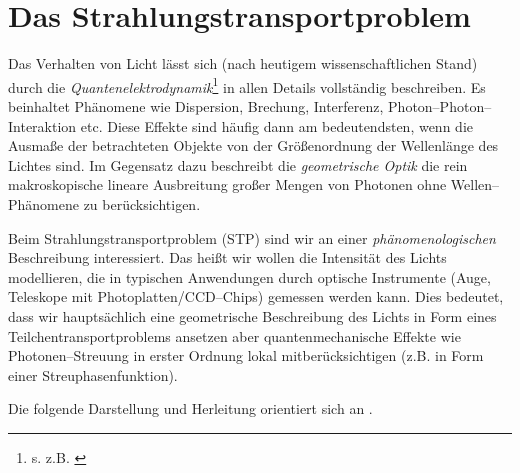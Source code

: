 	\chapter{Das Strahlungstransportproblem}
	\label{sec:radiative_transfer}
	
	Das Verhalten von Licht lässt sich (nach heutigem wissenschaftlichen Stand) durch die {\em Quantenelektrodynamik}\footnote{s. z.B. \citet{Feynman:1990p11684}} in allen Details vollständig beschreiben. Es beinhaltet Phänomene wie Dispersion, Brechung, Interferenz, Photon--Photon--Interaktion etc. Diese Effekte sind häufig dann am bedeutendsten, wenn die Ausmaße der betrachteten Objekte von der Größenordnung der Wellenlänge des Lichtes sind. Im Gegensatz dazu beschreibt die {\em geometrische Optik} die rein makroskopische lineare Ausbreitung großer Mengen von Photonen ohne Wellen--Phänomene zu berücksichtigen.
	
	Beim Strahlungstransportproblem (STP) sind wir an einer {\em phänomenologischen} Beschreibung interessiert. Das heißt wir wollen die Intensität des Lichts modellieren, die in typischen Anwendungen durch optische Instrumente (Auge, Teleskope mit Photoplatten/CCD--Chips) gemessen werden kann. Dies bedeutet, dass wir hauptsächlich eine geometrische Beschreibung des Lichts in Form eines Teilchentransportproblems ansetzen aber quantenmechanische Effekte wie Photonen--Streuung in erster Ordnung lokal mitberücksichtigen (z.B. in Form einer Streuphasenfunktion).
	
	Die folgende Darstellung und Herleitung orientiert sich an \citep{Arvo:1993p9035}.
	
